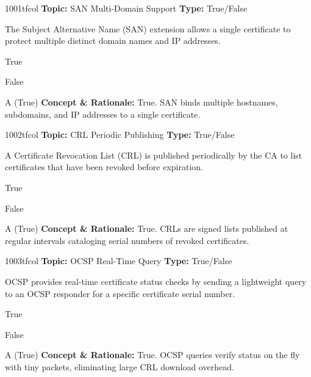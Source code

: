 \begin{qcard}{1001}{tfcol}
\textcolor{darkslate!75}{\small\textbf{Topic:} SAN Multi-Domain Support \hfill \textbf{Type:} True/False}\vspace{0.4em}\par
The Subject Alternative Name (SAN) extension allows a single certificate to protect multiple distinct domain names and IP addresses.
\begin{qoptions}
\item True
\item False
\end{qoptions}
\end{qcard}
\nopagebreak
\begin{explainbox}{A (True)}
\textbf{Concept \& Rationale:} True. SAN binds multiple hostnames, subdomains, and IP addresses to a single certificate.
\end{explainbox}

\begin{qcard}{1002}{tfcol}
\textcolor{darkslate!75}{\small\textbf{Topic:} CRL Periodic Publishing \hfill \textbf{Type:} True/False}\vspace{0.4em}\par
A Certificate Revocation List (CRL) is published periodically by the CA to list certificates that have been revoked before expiration.
\begin{qoptions}
\item True
\item False
\end{qoptions}
\end{qcard}
\nopagebreak
\begin{explainbox}{A (True)}
\textbf{Concept \& Rationale:} True. CRLs are signed lists published at regular intervals cataloging serial numbers of revoked certificates.
\end{explainbox}

\begin{qcard}{1003}{tfcol}
\textcolor{darkslate!75}{\small\textbf{Topic:} OCSP Real-Time Query \hfill \textbf{Type:} True/False}\vspace{0.4em}\par
OCSP provides real-time certificate status checks by sending a lightweight query to an OCSP responder for a specific certificate serial number.
\begin{qoptions}
\item True
\item False
\end{qoptions}
\end{qcard}
\nopagebreak
\begin{explainbox}{A (True)}
\textbf{Concept \& Rationale:} True. OCSP queries verify status on the fly with tiny packets, eliminating large CRL download overhead.
\end{explainbox}

